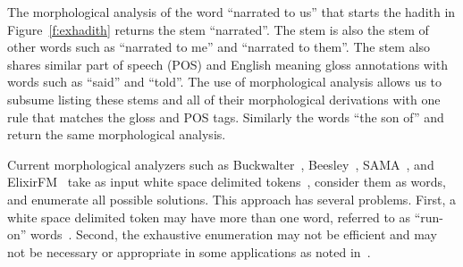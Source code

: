 \documentclass{llncs}
\begin{document}
The morphological analysis of the word  
``narrated to us'' that starts the hadith in Figure~\ref{f:exhadith}
returns the stem  ``narrated''.
The stem   is also the stem of other 
words such as  ``narrated to me'' and  ``narrated to them''.
The stem also shares similar part of speech (POS)
and English meaning gloss annotations with words
such as  ``said'' and  ``told''. 
The use of morphological analysis allows us to 
subsume listing these stems and all of their morphological
derivations with one rule that matches the gloss and 
POS tags. 
Similarly the words  ``the son of'' and  
return the same morphological analysis.
         


\novocalize

Current morphological analyzers such as 
Buckwalter~\cite{Buckwalter:02},
Beesley~\cite{Beesley:01},
SAMA~\cite{Kulick:10},
and ElixirFM~\cite{Otakar:07} 
take as input white space delimited tokens~\cite{Kulick:10},
consider them as words,
and enumerate all possible solutions. 
This approach has several problems. 
First, a white space delimited token may have 
more than one word, referred to as ``run-on'' 
words~\cite{Buckwalter:04}.
Second, the exhaustive enumeration may not be efficient and may
not be necessary or appropriate
in some applications as noted in~\cite{Maamouri:10}. 
\end{document}
